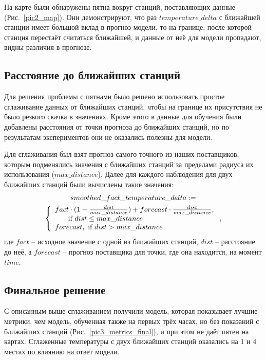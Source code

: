 \documentclass[14pt]{matmex-diploma}
\begin{document}
На карте были обнаружены пятна вокруг станций, поставляющих данные (Рис.~\ref{pic2_map}). Они демонстрируют, что раз $temperature\_delta$ с ближайшей станции имеет большой вклад в прогноз модели, то на границе, после которой станция перестаёт считаться ближайшей, и данные от неё для модели пропадают, видны различия в прогнозе.



\subsection{Расстояние до ближайших станций}

Для решения проблемы с пятнами было решено использовать простое сглаживание данных от ближайших станций, чтобы на границе их присутствия не было резкого скачка в значениях. Кроме этого в данные для обучения были добавлены расстояния от точки прогноза до ближайших станций, но по результатам экспериментов они не оказались полезны для модели.

Для сглаживания был взят прогноз самого точного из наших поставщиков, которым подменялись значения с ближайших станций за пределами радиуса их использования ($max\_distance$). Далее для каждого наблюдения для двух ближайших станций были вычислены такие значения: 
\begingroup
\setlength\abovedisplayskip{0pt}
\begin{multline*}
smoothed\_fact\_temperature\_delta := \\\left\{
                \begin{array}{ll}
                  fact \cdot (1 - \frac{dist}{max\_distance}) + forecast \cdot \frac{dist}{max\_distance},\\\indent \text{     if }dist \le max\_distance  \\
                  forecast, \text{ if } dist > max\_distance
                \end{array}
              \right.,
\end{multline*}
\endgroup
\indent где $fact$ -- исходное значение с одной из ближайших станций, $dist$ -- расстояние до неё, а $forecast$ -- прогноз поставщика для точки, где она находится, на момент $time$.


\subsection{Финальное решение}
С описанным выше сглаживанием получили модель, которая показывает лучшие метрики, чем модель, обученная также на первых трёх часах, но без показаний с ближайших станций (Рис.~\ref{pic3_metrics_final}), и при этом не даёт пятен на картах. Сглаженные температуры с двух ближайших станций оказались на 1 и 4 местах по влиянию на ответ модели.
\end{document}
